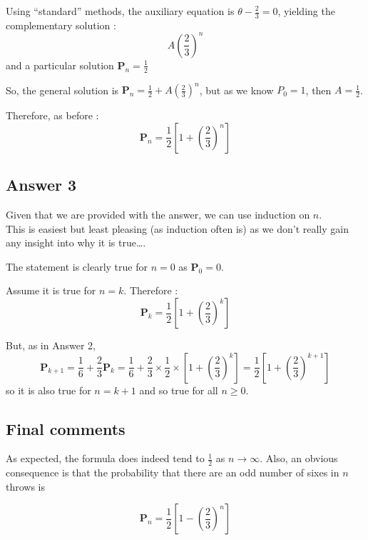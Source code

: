 \documentclass[a4paper,10pt]{article}
\begin{document}
\begin{flushleft}
Using ``standard'' methods, the auxiliary equation is $\theta - \frac{2}{3} = 0$, yielding the complementary solution : 
\begin{equation*} 
A\left(\frac{2}{3}\right)^n
\end{equation*} 
and a particular solution $\mathbf{P}_{n} = \frac{1}{2}$

So, the general solution is $\mathbf{P}_{n} = \frac{1}{2} + A\left(\frac{2}{3}\right)^n$, but as we know $P_0 = 1$, then $A = \frac{1}{2}$.

Therefore, as before :
\begin{equation*} 
\mathbf{P}_n = \frac{1}{2}\left[1 + \left({\frac{2}{3}}\right)^n\right] 
\end{equation*}

\subsection{Answer 3}
Given that we are provided with the answer, we can use induction on $n$. \\
This is easiest but least pleasing (as induction often is) as we don't really gain any insight into why it is true\ldots.

The statement is clearly true for $n = 0$ as  $\mathbf{P}_0 = 0$. 

Assume it is true for $n = k$. Therefore :
\begin{equation*} 
\mathbf{P}_k = \frac{1}{2}\left[1 + \left({\frac{2}{3}}\right)^k\right] 
\end{equation*}

But, as in Answer 2,
\begin{equation*} 
\mathbf{P}_{k+1} = \frac{1}{6} + \frac{2}{3}\mathbf{P}_{k}
= \frac{1}{6} + \frac{2}{3} \times \frac{1}{2} \times \left[1 + \left({\frac{2}{3}}\right)^k\right]
= \frac{1}{2}\left[1 + \left({\frac{2}{3}}\right)^{k+1}\right] 
\end{equation*} 
so it is also true for $n = k+1$ and so true for all $n \geq 0$.

\subsection{Final comments}
As expected, the formula does indeed tend to $\frac{1}{2}$ as $n \rightarrow \infty$. 
Also, an obvious consequence is that the probability that there are an odd number of sixes in $n$ throws is 
 
\begin{equation*} 
\mathbf{P}_n = \frac{1}{2}\left[1 - \left({\frac{2}{3}}\right)^n\right] 
\end{equation*}







\end{flushleft}
\end{document}
